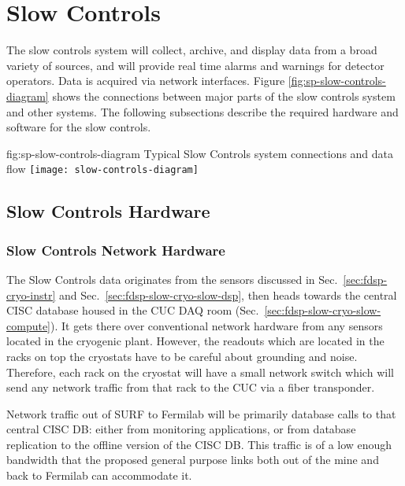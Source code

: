 \section{Slow Controls}
\label{sec:fdsp-slow-cryo-ctrl}


The slow controls system will collect, archive, and display data from
a broad variety of sources, and will provide real time alarms and
warnings for detector operators. Data is acquired via network
interfaces.  Figure \ref{fig:sp-slow-controls-diagram} shows the
connections between major parts of the slow controls system and other
systems.  The following subsections describe the required hardware and
software for the slow controls.

\begin{dunefigure}{fig:sp-slow-controls-diagram}
{Typical Slow Controls system connections and data flow}
\texttt{[image: slow-controls-diagram]}
\end{dunefigure}





\subsection{Slow Controls Hardware}
\label{sec:fdsp-slow-cryo-hdwr}

\subsubsection{Slow Controls Network Hardware}
\label{sec:fdsp-slow-cryo-slow-network}
The Slow Controls data originates from the sensors discussed in
Sec.~\ref{sec:fdsp-cryo-instr} and
Sec.~\ref{sec:fdsp-slow-cryo-slow-dsp}, then heads towards the central
CISC database housed in the CUC DAQ room
(Sec.~\ref{sec:fdsp-slow-cryo-slow-compute}).  It gets there over
conventional network hardware from any sensors located in the cryogenic
plant.  However, the readouts which are located in the racks on top the
cryostats have to be careful about grounding and noise.  Therefore, each
rack on the cryostat will have a small network switch which will send
any network traffic from that rack to the CUC via a fiber transponder.

Network traffic out of SURF to Fermilab will be primarily database calls
to that central CISC DB: either from monitoring applications, or from
database replication to the offline version of the CISC DB.  This
traffic is of a low enough bandwidth that the proposed general purpose
links both out of the mine and back to Fermilab can accommodate it.

